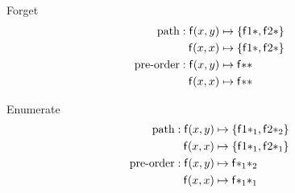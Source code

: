 

	
	\begin{block}{Forget}
		\vspace{-1em}
	\begin{align*}
		\text{path}: {\mathsf f}(x,y)  &\mapsto \{ {\mathsf f} 1 {*}, {\mathsf f} 2 {*} \}
		\\
		{\mathsf f}(x,x)  &\mapsto \{ {\mathsf f} 1 {*}, {\mathsf f} 2 {*} \}
		\\
		\text{pre-order}:
		{\mathsf f}(x,y) &\mapsto {\mathsf f} {*} {*}
		\\
		{\mathsf f}(x,x) &\mapsto {\mathsf f} {*} {*}
			\end{align*}
			\end{block}
%	

\begin{block}{Enumerate}
	\vspace{-1em}	
	\begin{align*}
		\text{path}: {\mathsf f}(x,y)  &\mapsto \{ {\mathsf f} 1 {*_1}, {\mathsf f} 2 {*_2}  \}
		\\
		{\mathsf f}(x,x)  &\mapsto \{ {\mathsf f} 1 {*_1}, {\mathsf f} 2 {*_1} \}
		\\
		\text{pre-order}:
		{\mathsf f}(x,y) &\mapsto {\mathsf f} {*_1} {*_2}
		\\
		{\mathsf f}(x,x) &\mapsto {\mathsf f} {*_1} {*_1}
	\end{align*}
	\end{block}